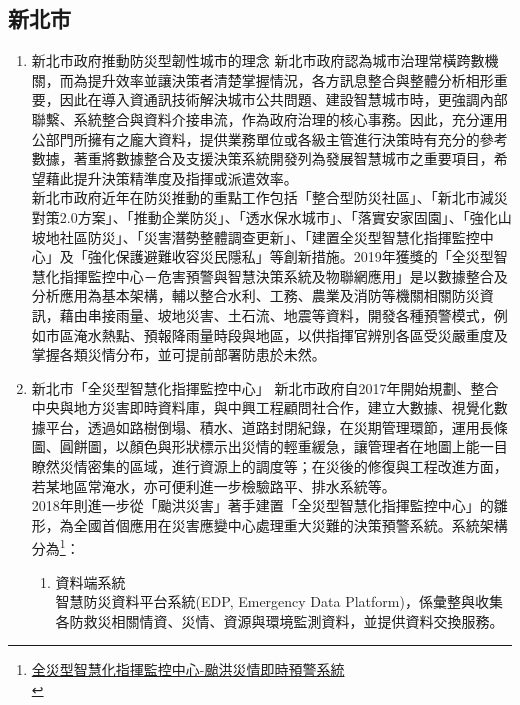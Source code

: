 \documentclass[a4paper,12pt]{article}
\begin{document}
\subsection{新北市}
\label{sec:orgde8a213}
\begin{enumerate}
\item 新北市政府推動防災型韌性城市的理念
\label{sec:org1e702c4}
新北市政府認為城市治理常橫跨數機關，而為提升效率並讓決策者清楚掌握情況，各方訊息整合與整體分析相形重要，因此在導入資通訊技術解決城市公共問題、建設智慧城市時，更強調內部聯繫、系統整合與資料介接串流，作為政府治理的核心事務。因此，充分運用公部門所擁有之龐大資料，提供業務單位或各級主管進行決策時有充分的參考數據，著重將數據整合及支援決策系統開發列為發展智慧城市之重要項目，希望藉此提升決策精準度及指揮或派遣效率。\\

新北市政府近年在防災推動的重點工作包括「整合型防災社區」、「新北市減災對策2.0方案」、「推動企業防災」、「透水保水城市」、「落實安家固園」、「強化山坡地社區防災」、「災害潛勢整體調查更新」、「建置全災型智慧化指揮監控中心」及「強化保護避難收容災民隱私」等創新措施。2019年獲獎的「全災型智慧化指揮監控中心－危害預警與智慧決策系統及物聯網應用」是以數據整合及分析應用為基本架構，輔以整合水利、工務、農業及消防等機關相關防災資訊，藉由串接雨量、坡地災害、土石流、地震等資料，開發各種預警模式，例如市區淹水熱點、預報降雨量時段與地區，以供指揮官辨別各區受災嚴重度及掌握各類災情分布，並可提前部署防患於未然。\\
\item 新北市「全災型智慧化指揮監控中心」
\label{sec:orgbaad900}
新北市政府自2017年開始規劃、整合中央與地方災害即時資料庫，與中興工程顧問社合作，建立大數據、視覺化數據平台，透過如路樹倒塌、積水、道路封閉紀錄，在災期管理環節，運用長條圖、圓餅圖，以顏色與形狀標示出災情的輕重緩急，讓管理者在地圖上能一目瞭然災情密集的區域，進行資源上的調度等；在災後的修復與工程改進方面，若某地區常淹水，亦可便利進一步檢驗路平、排水系統等。\\
2018年則進一步從「颱洪災害」著手建置「全災型智慧化指揮監控中心」的雛形，為全國首個應用在災害應變中心處理重大災難的決策預警系統。系統架構分為\footnote{\href{http://smartcity.org.tw/application\_detail.php?id=62\&PHPSESSID=7mu78jtksuqe689dlia45c9fk6}{全災型智慧化指揮監控中心-颱洪災情即時預警系統}\\\label{orga6cbf8d}}：\\
\begin{enumerate}
\item 資料端系統\\
智慧防災資料平台系統(EDP, Emergency Data Platform)，係彙整與收集各防救災相關情資、災情、資源與環境監測資料，並提供資料交換服務。\\

\end{enumerate}
\end{enumerate}
\end{document}
